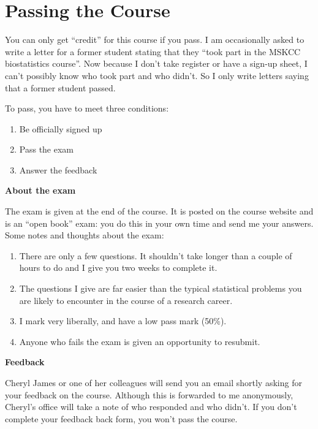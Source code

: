 \documentclass[]{book}
\providecommand{\tightlist}{%
  \setlength{\itemsep}{0pt}\setlength{\parskip}{0pt}}
\begin{document}
\hypertarget{passing-the-course}{%
\section*{Passing the Course}\label{passing-the-course}}

You can only get ``credit'' for this course if you pass. I am
occasionally asked to write a letter for a former student stating that
they ``took part in the MSKCC biostatistics course''. Now because I
don't take register or have a sign-up sheet, I can't possibly know who
took part and who didn't. So I only write letters saying that a former
student passed.

To pass, you have to meet three conditions:

\begin{enumerate}
\def\labelenumi{\arabic{enumi}.}
\tightlist
\item
  Be officially signed up
\item
  Pass the exam
\item
  Answer the feedback
\end{enumerate}

\textbf{About the exam}

The exam is given at the end of the course. It is posted on the course
website and is an ``open book'' exam: you do this in your own time and
send me your answers. Some notes and thoughts about the exam:

\begin{enumerate}
\def\labelenumi{\arabic{enumi}.}
\tightlist
\item
  There are only a few questions. It shouldn't take longer than a couple
  of hours to do and I give you two weeks to complete it.
\item
  The questions I give are far easier than the typical statistical
  problems you are likely to encounter in the course of a research
  career.
\item
  I mark very liberally, and have a low pass mark (50\%).
\item
  Anyone who fails the exam is given an opportunity to resubmit.
\end{enumerate}

\textbf{Feedback}

Cheryl James or one of her colleagues will send you an email shortly
asking for your feedback on the course. Although this is forwarded to me
anonymously, Cheryl's office will take a note of who responded and who
didn't. If you don't complete your feedback back form, you won't pass
the course.
\end{document}
